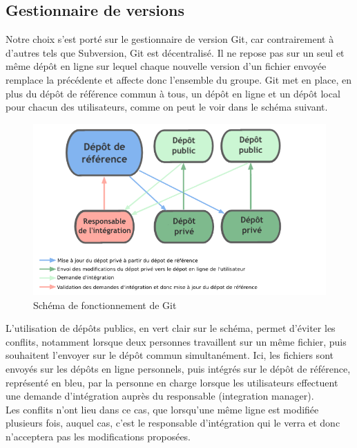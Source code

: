 \documentclass{report}
\begin{document}
\subsection{Gestionnaire de versions}
\hspace{0.5cm}Notre choix s'est porté sur le gestionnaire de version Git, car contrairement à d'autres tels que Subversion, Git est décentralisé. Il ne repose pas sur un seul et même dépôt en ligne sur lequel chaque nouvelle version d'un fichier envoyée remplace la précédente et affecte donc l'ensemble du groupe. Git met en place, en plus du dépôt de référence commun à tous, un dépôt en ligne et un dépôt local pour chacun des utilisateurs, comme on peut le voir dans le schéma suivant.\par
\begin{figure}[H]
	\begin{center}
			\includegraphics[scale=0.6]{./imagesRapport/schemaGit.png}
	\end{center}
	\caption[Schéma de fonctionnement de Git]{Schéma de fonctionnement de Git}
\end{figure}
\medskip
					 L'utilisation de dépôts publics, en vert clair sur le schéma, permet d'éviter les conflits, notamment lorsque deux personnes travaillent sur un même fichier, puis souhaitent l'envoyer sur le dépôt commun simultanément. Ici, les fichiers sont envoyés sur les dépôts en ligne personnels, puis intégrés sur le dépôt de référence, représenté en bleu, par la personne en charge lorsque les utilisateurs effectuent une demande d'intégration auprès du responsable (integration manager).\\
				
	Les conflits n'ont lieu dans ce cas, que lorsqu'une même ligne est modifiée plusieurs fois, auquel cas, c'est le responsable d'intégration qui le verra et donc n'acceptera pas les modifications proposées.
\end{document}
